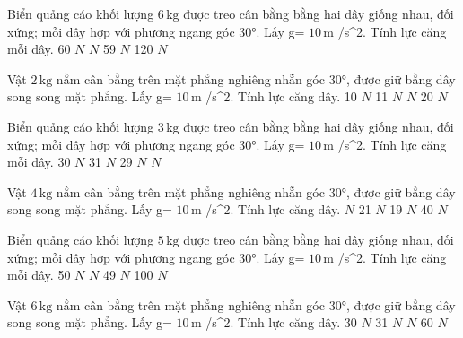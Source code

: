 \begin{ex}
Biển quảng cáo khối lượng $6\,\text{kg}$ được treo cân bằng bằng hai dây giống nhau, đối xứng; mỗi dây hợp với phương ngang góc 30°. Lấy g= $10\,\text{m}$ /s^2. Tính lực căng mỗi dây.
\choice
{60 $N$}
{ $N$}
{59 $N$}
{120 $N$}
\end{ex}

\begin{ex}
Vật $2\,\text{kg}$ nằm cân bằng trên mặt phẳng nghiêng nhẵn góc 30°, được giữ bằng dây song song mặt phẳng. Lấy g= $10\,\text{m}$ /s^2. Tính lực căng dây.
\choice
{10 $N$}
{11 $N$}
{ $N$}
{20 $N$}
\end{ex}

\begin{ex}
Biển quảng cáo khối lượng $3\,\text{kg}$ được treo cân bằng bằng hai dây giống nhau, đối xứng; mỗi dây hợp với phương ngang góc 30°. Lấy g= $10\,\text{m}$ /s^2. Tính lực căng mỗi dây.
\choice
{30 $N$}
{31 $N$}
{29 $N$}
{ $N$}
\end{ex}

\begin{ex}
Vật $4\,\text{kg}$ nằm cân bằng trên mặt phẳng nghiêng nhẵn góc 30°, được giữ bằng dây song song mặt phẳng. Lấy g= $10\,\text{m}$ /s^2. Tính lực căng dây.
\choice
{ $N$}
{21 $N$}
{19 $N$}
{40 $N$}
\end{ex}

\begin{ex}
Biển quảng cáo khối lượng $5\,\text{kg}$ được treo cân bằng bằng hai dây giống nhau, đối xứng; mỗi dây hợp với phương ngang góc 30°. Lấy g= $10\,\text{m}$ /s^2. Tính lực căng mỗi dây.
\choice
{50 $N$}
{ $N$}
{49 $N$}
{100 $N$}
\end{ex}

\begin{ex}
Vật $6\,\text{kg}$ nằm cân bằng trên mặt phẳng nghiêng nhẵn góc 30°, được giữ bằng dây song song mặt phẳng. Lấy g= $10\,\text{m}$ /s^2. Tính lực căng dây.
\choice
{30 $N$}
{31 $N$}
{ $N$}
{60 $N$}
\end{ex}

